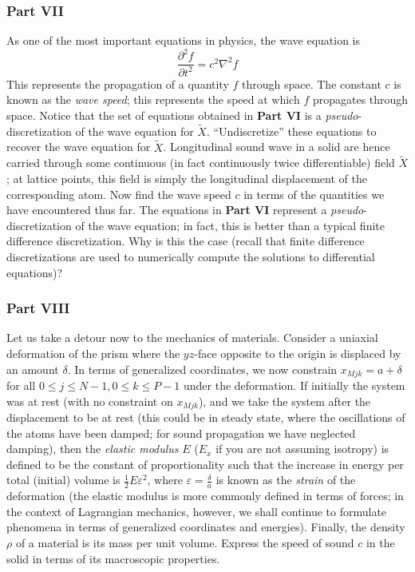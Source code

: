 \documentclass[letterpaper,12pt]{article}
\newcommand*{\npderiv}[3]{\frac{\partial^{#3} #1}{\partial #2^{#3}}}
\begin{document}
\begin{flushleft}
    \subsubsection*{Part VII}
    As one of the most important equations in physics, the wave equation is
    $$\npderiv{f}{t}{2} = c^2 \nabla^2 f$$
    This represents the propagation of a quantity $f$ through space. The constant $c$ is known as the \textit{wave speed}; this represents the speed at which $f$ propagates through space. Notice that the set of equations obtained in \textbf{Part VI} is a \textit{pseudo}-discretization of the wave equation for $\tilde{X}$. \newline\newline
    ``Undiscretize'' these equations to recover the wave equation for $\tilde{X}$. Longitudinal sound wave in a solid are hence carried through some continuous (in fact continuously twice differentiable) field $\tilde{X}$; at lattice points, this field is simply the longitudinal displacement of the corresponding atom. Now find the wave speed $c$ in terms of the quantities we have encountered thus far. The equations in \textbf{Part VI} represent a \textit{pseudo}-discretization of the wave equation; in fact, this is better than a typical finite difference discretization. Why is this the case (recall that finite difference discretizations are used to numerically compute the solutions to differential equations)?

    \subsubsection*{Part VIII}
    Let us take a detour now to the mechanics of materials. Consider a uniaxial deformation of the prism where the $yz$-face opposite to the origin is displaced by an amount $\delta$. In terms of generalized coordinates, we now constrain $x_{Mjk} = a + \delta$ for all $0 \leq j \leq N-1, 0 \leq k \leq P-1$ under the deformation. If initially the system was at rest (with no constraint on $x_{Mjk}$), and we take the system after the displacement to be at rest (this could be in steady state, where the oscillations of the atoms have been damped; for sound propagation we have neglected damping), then the \textit{elastic modulus} $E$ ($E_x$ if you are not assuming isotropy) is defined to be the constant of proportionality such that the increase in energy per total (initial) volume is $\frac{1}{2}E\varepsilon^2$, where $\varepsilon = \frac{\delta}{a}$ is known as the \textit{strain} of the deformation (the elastic modulus is more commonly defined in terms of forces; in the context of Lagrangian mechanics, however, we shall continue to formulate phenomena in terms of generalized coordinates and energies). Finally, the density $\rho$ of a material is its mass per unit volume.\newline\newline
    Express the speed of sound $c$ in the solid in terms of its macroscopic properties.


\end{flushleft}
\end{document}

